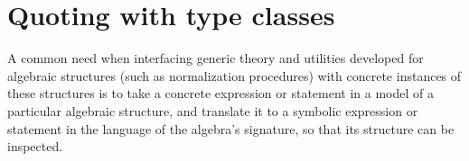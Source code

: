 \documentclass[a4paper,10pt,runningheads]{llncs}
\begin{document}
% 
% 
% 
% 



\section{Quoting with type classes}\label{quoting}

A common need when interfacing generic theory and utilities developed for algebraic structures (such as normalization procedures) with concrete instances of these structures is to take a concrete expression or statement in a model of a particular algebraic structure, and translate it to a symbolic expression or statement in the language of the algebra's signature, so that its structure can be inspected.
\end{document}
